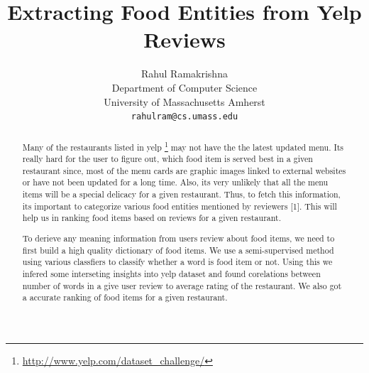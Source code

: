\documentclass{article} %
\title{Extracting Food Entities from Yelp Reviews}
\author{
Rahul Ramakrishna \\
Department of Computer Science\\
University of Massachusetts Amherst\\
\texttt{rahulram@cs.umass.edu} \\
}
\begin{document}
\maketitle


\begin{abstract}

Many of the restaurants listed in yelp \footnote{\url{http://www.yelp.com/dataset_challenge/}} may not have the the latest updated menu. Its really hard for the user to figure out, which food item is served best in a given restaurant since, most of the menu cards are graphic images linked to external websites or have not been updated for a long time. Also, its very unlikely that all the menu items will be a special delicacy for a given restaurant. Thus, to fetch this information, its important to categorize various food entities mentioned by reviewers [1]. This will help us in ranking food items based on reviews for a given restaurant. 

To derieve any meaning information from users review about food items, we need to first build a high quality dictionary of food items. We use a semi-supervised method using various classfiers to classify whether a word is food item or not. Using this we infered some interseting insights into yelp dataset and found corelations between number of words in a give user review to average rating of the restaurant. We also got a accurate ranking of food items for a given restaurant.




\end{abstract}
\end{document}
